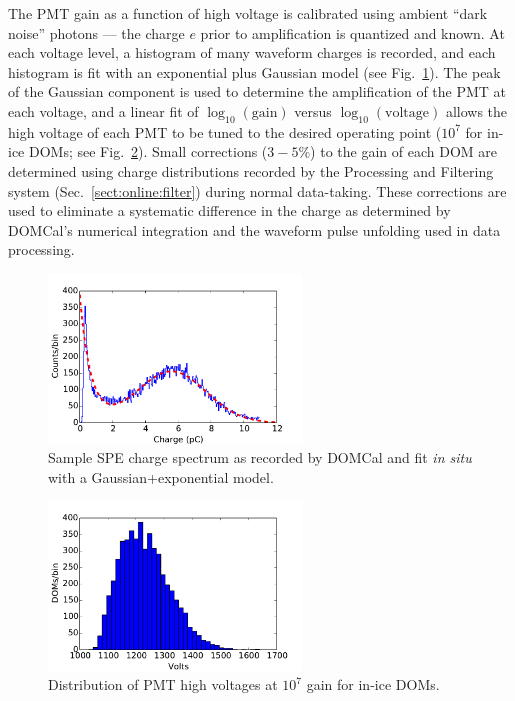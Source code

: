 The PMT gain as a function of high voltage is calibrated using ambient
``dark noise'' photons --- the charge $e$ prior to amplification is quantized
and known.  At each voltage level, a histogram of many waveform charges is recorded,
and each histogram is fit with an exponential plus Gaussian model (see
Fig.~\ref{fig:domcal_hvfit}).  The peak of the Gaussian component is used to
determine the amplification of the PMT at each voltage, and a linear fit
of $\log_{10}(\mathrm{gain})$ versus $\log_{10}(\mathrm{voltage})$ allows
the high voltage of each PMT to be tuned to the desired operating point ($10^7$
for in-ice DOMs; see Fig.~\ref{fig:domcal_hv_settings}).  Small 
corrections ($3-5\%$) to the gain of each DOM are determined using charge
distributions recorded by the Processing and Filtering system
(Sec.~\ref{sect:online:filter}) during normal data-taking.  These
corrections are used to eliminate a systematic difference in the charge as
determined by DOMCal's numerical integration and the waveform pulse
unfolding used in data processing. 

\begin{figure}[!h]
 \centering
 \includegraphics[width=0.6\textwidth]{graphics/dom/domcal/hvfit.pdf}
 \caption{Sample SPE charge spectrum as recorded by DOMCal and fit
   \textit{in situ} with a Gaussian+exponential model.} 
 \label{fig:domcal_hvfit}
\end{figure}

\begin{figure}[!h]
 \centering
 \includegraphics[width=0.6\textwidth]{graphics/dom/domcal/inice_hv_2016.pdf}
 \caption{Distribution of PMT high voltages at $10^7$ gain for in-ice DOMs.}
 \label{fig:domcal_hv_settings}
\end{figure}

